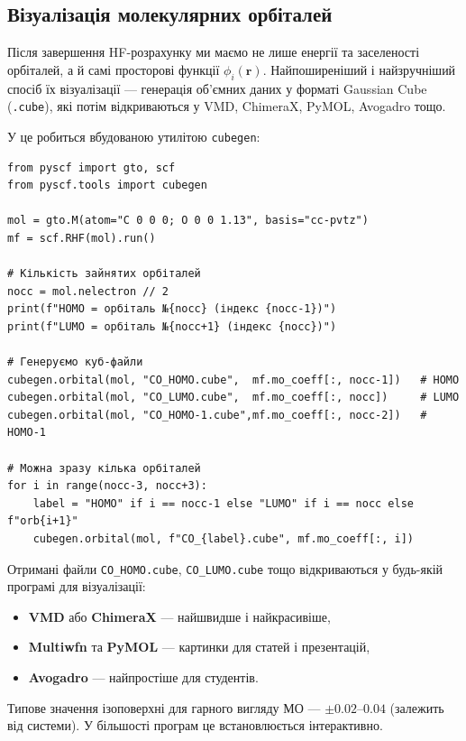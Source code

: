 \subsection{Візуалізація молекулярних орбіталей}

Після завершення HF-розрахунку ми маємо не лише енергії та заселеності орбіталей, а й самі просторові функції $\phi_i(\mathbf{r})$. Найпоширеніший і найзручніший спосіб їх візуалізації --- генерація об’ємних даних у форматі Gaussian Cube (\texttt{.cube}), які потім відкриваються у VMD, ChimeraX, PyMOL, Avogadro тощо.

У \PySCF{} це робиться вбудованою утилітою \texttt{cubegen}:

\begin{verbatim}
from pyscf import gto, scf
from pyscf.tools import cubegen

mol = gto.M(atom="C 0 0 0; O 0 0 1.13", basis="cc-pvtz")
mf = scf.RHF(mol).run()

# Кількість зайнятих орбіталей
nocc = mol.nelectron // 2
print(f"HOMO = орбіталь №{nocc} (індекс {nocc-1})")
print(f"LUMO = орбіталь №{nocc+1} (індекс {nocc})")

# Генеруємо куб-файли
cubegen.orbital(mol, "CO_HOMO.cube",  mf.mo_coeff[:, nocc-1])   # HOMO
cubegen.orbital(mol, "CO_LUMO.cube",  mf.mo_coeff[:, nocc])     # LUMO
cubegen.orbital(mol, "CO_HOMO-1.cube",mf.mo_coeff[:, nocc-2])   # HOMO-1

# Можна зразу кілька орбіталей
for i in range(nocc-3, nocc+3):
    label = "HOMO" if i == nocc-1 else "LUMO" if i == nocc else f"orb{i+1}"
    cubegen.orbital(mol, f"CO_{label}.cube", mf.mo_coeff[:, i])
\end{verbatim}

Отримані файли \texttt{CO\_HOMO.cube}, \texttt{CO\_LUMO.cube} тощо відкриваються у будь-якій програмі для візуалізації:
\begin{itemize}
    \item \textbf{VMD} або \textbf{ChimeraX} --- найшвидше і найкрасивіше,
    \item \textbf{Multiwfn} та \textbf{PyMOL} --- картинки для статей і презентацій,
    \item \textbf{Avogadro} --- найпростіше для студентів.
\end{itemize}

Типове значення ізоповерхні для гарного вигляду МО --- $\pm 0.02$–$0.04$ (залежить від системи). У більшості програм це встановлюється інтерактивно.


